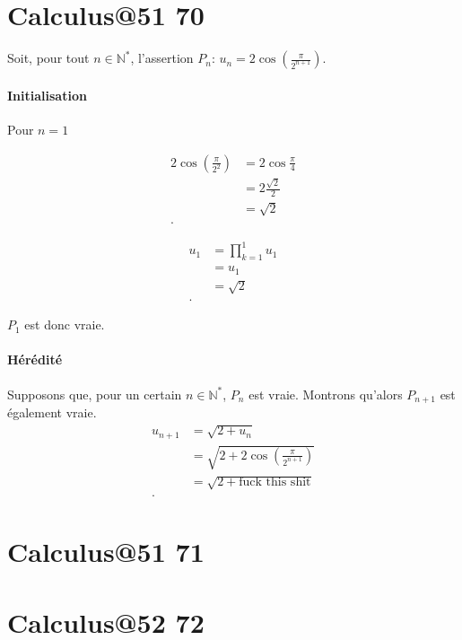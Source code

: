 \documentclass{article}
\newcommand{\N}{\mathbb{N}}
\begin{document}
\section{Calculus@51 70} %

Soit, pour tout $n \in \N^{\ast}$, l'assertion $P_n$: $u_n = 2\cos\left( \frac{\pi}{2^{n+1}} \right) $.

\paragraph{Initialisation} Pour $n = 1$

\begin{align*}
	2\cos\left( \frac{\pi}{2^{2}} \right) &= 2\cos\frac{\pi}{4} \\
	&= 2 \frac{\sqrt{2} }{2}  \\
	&= \sqrt{2}  \\
.\end{align*}

\begin{align*}
	u_1 &= \prod_{k=1}^{1} u_1  \\
	&= u_1 \\
	&= \sqrt{2}  \\
.\end{align*}

$P_1$ est donc vraie.

\paragraph{Hérédité} Supposons que, pour un certain $n \in \N^{\ast}$, $P_n$ est vraie. Montrons qu'alors $P_{n+1}$ est également vraie.
\begin{align*}
	u_{n+1} &= \sqrt{2+u_n}  \\
		&= \sqrt{2+2\cos\left( \frac{\pi}{2^{n+1}} \right) }  \\
		&= \sqrt{2+\text{fuck this shit}}  \\
.\end{align*}

\section{Calculus@51 71} %
\subsection{}

\section{Calculus@52 72} %
\end{document}
